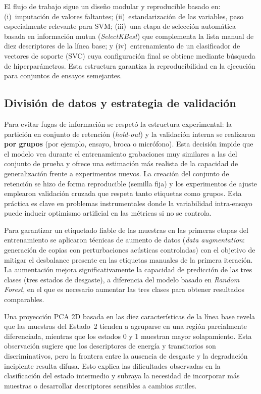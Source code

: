 \documentclass[12pt, letterpaper]{report}
\begin{document}
El flujo de trabajo sigue un diseño modular y reproducible basado en: (i)~imputación de valores faltantes; (ii)~estandarización de las variables, paso especialmente relevante para SVM; (iii)~una etapa de selección automática basada en información mutua (\textit{SelectKBest}) que complementa la lista manual de diez descriptores de la línea base; y (iv)~entrenamiento de un clasificador de vectores de soporte (SVC) cuya configuración final se obtiene mediante búsqueda de hiperparámetros. Esta estructura garantiza la reproducibilidad en la ejecución para conjuntos de ensayos semejantes.

\subsection{División de datos y estrategia de validación}

Para evitar fugas de información se respetó la estructura experimental: la partición en conjunto de retención (\textit{hold-out}) y la validación interna se realizaron \textbf{por grupos} (por ejemplo, ensayo, broca o micrófono). Esta decisión impide que el modelo vea durante el entrenamiento grabaciones muy similares a las del conjunto de prueba y ofrece una estimación más realista de la capacidad de generalización frente a experimentos nuevos. La creación del conjunto de retención se hizo de forma reproducible (semilla fija) y los experimentos de ajuste emplearon validación cruzada que respeta tanto etiquetas como grupos. Esta práctica es clave en problemas instrumentales donde la variabilidad intra-ensayo puede inducir optimismo artificial en las métricas si no se controla.

Para garantizar un etiquetado fiable de las muestras en las primeras etapas del entrenamiento se aplicaron técnicas de aumento de datos (\textit{data augmentation}: generación de copias con perturbaciones acústicas controladas) con el objetivo de mitigar el desbalance presente en las etiquetas manuales de la primera iteración. La aumentación mejora significativamente la capacidad de predicción de las tres clases (tres estados de desgaste), a diferencia del modelo basado en \textit{Random Forest}, en el que es necesario aumentar las tres clases para obtener resultados comparables.

Una proyección PCA 2D basada en las diez características de la línea base revela que las muestras del Estado~2 tienden a agruparse en una región parcialmente diferenciada, mientras que los estados 0 y 1 muestran mayor solapamiento. Esta observación sugiere que los descriptores de energía y transitorios son discriminativos, pero la frontera entre la ausencia de desgaste y la degradación incipiente resulta difusa. Esto explica las dificultades observadas en la clasificación del estado intermedio y subraya la necesidad de incorporar más muestras o desarrollar descriptores sensibles a cambios sutiles.
\end{document}
